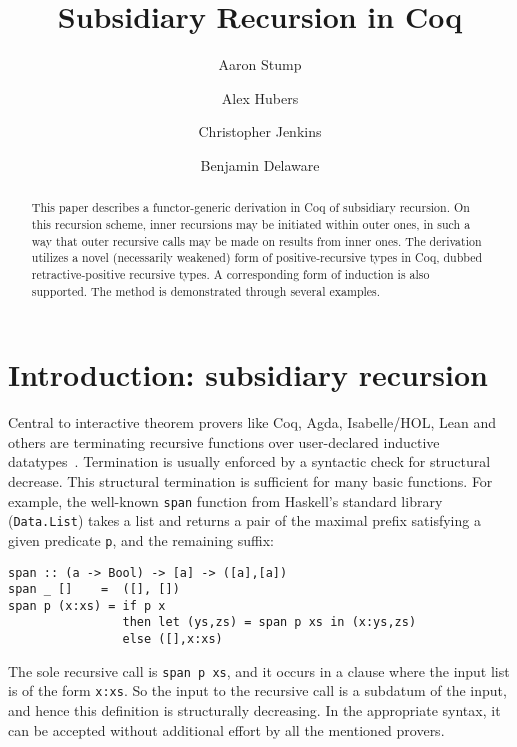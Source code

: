 \documentclass[a4paper,USenglish]{lipics-v2021}
\title{Subsidiary Recursion in Coq} %
\author{Aaron Stump}{Computer Science Dept., The University of Iowa, USA \and \url{http://www.cs.uiowa.edu/~astump/}}{aaron-stump@uiowa.edu}{http://orcid.org/0000-0002-9720-0003}{}%
\author{Alex Hubers}{Computer Science, The University of Iowa, USA}{alexander-hubers@uiowa.edu}{}{}
\author{Christopher Jenkins}{Computer Science, The University of Iowa, USA}{alexander-hubers@uiowa.edu}{http://orcid.org/
0000-0002-5434-5018}{}
\author{Benjamin Delaware}{Computer Science, Purdue University, USA \and \url{https://www.cs.purdue.edu/homes/bendy/}}{bendy@purdue.edu}{}{}
\begin{document}
\maketitle

\begin{abstract}
  This paper describes a functor-generic derivation in Coq of
  subsidiary recursion.  On this recursion scheme, inner recursions
  may be initiated within outer ones, in such a way that outer
  recursive calls may be made on results from inner ones.  The
  derivation utilizes a novel (necessarily weakened) form of
  positive-recursive types in Coq, dubbed retractive-positive
  recursive types.  A corresponding form of induction is also
  supported.  The method is demonstrated through several examples.
\end{abstract}

\section{Introduction: subsidiary recursion}

Central to interactive theorem provers like Coq, Agda, Isabelle/HOL,
Lean and others are terminating recursive functions over user-declared
inductive datatypes~\cite{agda,coq,isabelle-hol,lean}.  Termination is
usually enforced by a syntactic check for structural decrease.  This
structural termination is sufficient for many basic functions.  For
example, the well-known \texttt{span} function from Haskell's standard
library (\verb|Data.List|) takes a list and returns a pair of the
maximal prefix satisfying a given predicate \verb|p|, and the
remaining suffix:
\begin{verbatim}
span :: (a -> Bool) -> [a] -> ([a],[a])
span _ []    =  ([], [])
span p (x:xs) = if p x
                then let (ys,zs) = span p xs in (x:ys,zs)
                else ([],x:xs)
\end{verbatim}
\noindent The sole recursive call is \verb|span p xs|, and it occurs
in a clause where the input list is of the form \verb|x:xs|.  So the
input to the recursive call is a subdatum of the input, and hence this
definition is structurally decreasing.  In the appropriate syntax, it
can be accepted without additional effort by all the mentioned
provers.
\end{document}
